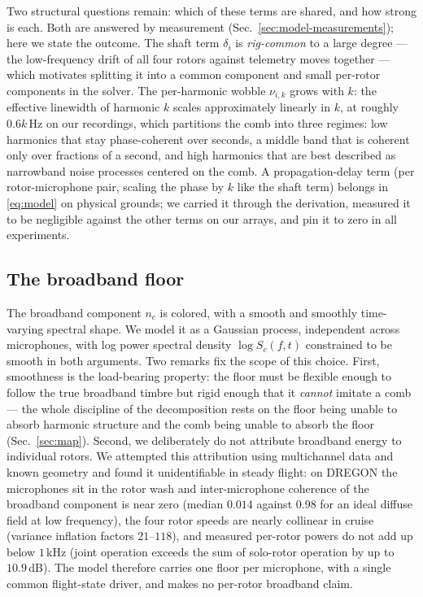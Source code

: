 \documentclass[journal]{IEEEtran}
\begin{document}
Two structural questions remain: which of these terms are shared, and
how strong is each. Both are answered by measurement
(Sec.~\ref{sec:model-measurements}); here we state the outcome. The
shaft term $\delta_i$ is \emph{rig-common} to a large degree --- the
low-frequency drift of all four rotors against telemetry moves together
--- which motivates splitting it into a common component and small
per-rotor components in the solver. The per-harmonic wobble $\nu_{i,k}$
grows with $k$: the effective linewidth of harmonic $k$ scales
approximately linearly in $k$, at roughly $0.6k$\,Hz on our recordings,
which partitions the comb into three regimes: low harmonics that stay
phase-coherent over seconds, a middle band that is coherent only over
fractions of a second, and high harmonics that are best described as
narrowband noise processes centered on the comb. A propagation-delay
term (per rotor-microphone pair, scaling the phase by $k$ like the shaft
term) belongs in \eqref{eq:model} on physical grounds; we carried it
through the derivation, measured it to be negligible against the other
terms on our arrays, and pin it to zero in all experiments.

\subsection{The broadband floor}
\label{sec:model-floor}

The broadband component $n_c$ is colored, with a smooth and smoothly
time-varying spectral shape. We model it as a Gaussian process, independent
across microphones, with log power spectral density $\log S_c(f, t)$
constrained to be smooth in both arguments. Two remarks fix the scope of
this choice. First, smoothness is the load-bearing property: the floor
must be flexible enough to follow the true broadband timbre but rigid
enough that it \emph{cannot} imitate a comb --- the whole discipline of
the decomposition rests on the floor being unable to absorb harmonic
structure and the comb being unable to absorb the floor
(Sec.~\ref{sec:map}). Second, we deliberately do not attribute broadband
energy to individual rotors. We attempted this attribution using
multichannel data and known geometry and found it unidentifiable in
steady flight: on DREGON the microphones sit in the rotor wash and
inter-microphone coherence of the broadband component is near zero
(median $0.014$ against $0.98$ for an ideal diffuse field at low
frequency), the four rotor speeds are nearly collinear in cruise
(variance inflation factors $21$--$118$), and measured per-rotor powers
do not add up below $1$\,kHz (joint operation exceeds the sum of
solo-rotor operation by up to $10.9$\,dB). The model therefore carries
one floor per microphone, with a single common flight-state driver, and
makes no per-rotor broadband claim.
\end{document}
